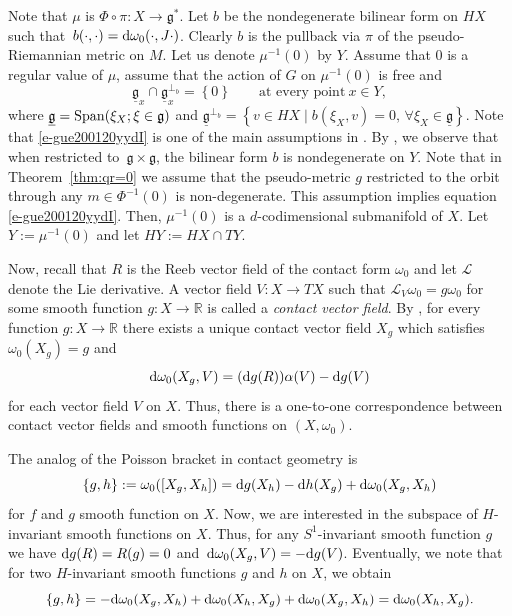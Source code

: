 \documentclass[pdftex]{sigma}
\numberwithin{equation}{section}
\newcommand{\set}[1]{\left\{#1\right\}}
\begin{document}
 	Note that $\mu$ is $\Phi\circ \pi \colon X \rightarrow \mathfrak{g}^*$. Let $b$ be the nondegenerate bilinear form on $HX$ such that~${
	 	b(\cdot , \cdot) = {\rm d}\omega_0(\cdot , J\cdot)}$.
	 Clearly $b$ is the pullback via $\pi$ of the pseudo-Riemannian metric on $M$. Let us denote $\mu^{-1}(0)$ by $Y$. Assume that $0$ is a regular value of $\mu$, assume that the action of $G$ on $\mu^{-1}(0)$ is free and
	 \begin{equation}\label{e-gue200120yydI}
	\underline{\mathfrak{g}}_x\cap \underline{\mathfrak{g}}^{\perp_b}_x=\set{0}\qquad \text{at every point} \ x\in Y,
	 \end{equation}
	 where $\underline{\mathfrak{g}}={\rm Span}(\xi_X; \xi\in\mathfrak{g})$
	 and
$\underline{\mathfrak{g}}^{\perp_b}=\set{v\in HX \mid b(\xi_X,v)=0,\,\forall \xi_X\in\underline{\mathfrak{g}}}$.
	 Note that \eqref{e-gue200120yydI} is one of the main assumptions in \cite{hsiaohuang}. By \cite[Section 2.5]{hsiaohuang}, we observe that when restricted to~${\mathfrak{g}\times \mathfrak{g}}$, the bilinear form $b$ is nondegenerate on $Y$. Note that in Theorem~\ref{thm:qr=0} we assume that the pseudo-metric $g$ restricted to the orbit through any $m\in \Phi^{-1}(0)$ is non-degenerate. This assumption implies equation \eqref{e-gue200120yydI}. Then, $\mu^{-1}(0)$ is a $d$-codimensional submanifold of $X$. Let $Y:=\mu^{-1}(0)$ and let $HY:=HX\cap TY$.
	
	
	 Now, recall that $R$ is the Reeb vector field of the contact form $\omega_0$ and let $\mathcal{L}$ denote the Lie derivative. A vector field $V \colon X \rightarrow TX$ such that $\mathcal{L}_V\omega_0=g \omega_0$ for some smooth function $g \colon X\rightarrow \mathbb{R}$ is called a \textit{contact vector field}. By \cite[Lemma 3.5.14]{mds}, for every function $g \colon X\rightarrow \mathbb{R}$ there exists a unique contact vector field $X_g$ which satisfies
	$\omega_0(X_g)=g $
	 and
	 \[ {\rm d}\omega_0(X_g, V)=({\rm d}g(R)) \alpha(V)-{\rm d}g(V)\]
	 for each vector field $V$ on $X$.
	 Thus, there is a one-to-one correspondence between contact vector fields and smooth functions on $(X, \omega_0)$.
	
	 The analog of the Poisson bracket in contact geometry is
	 \[\{g, h\}:=\omega_0([X_g, X_h])={\rm d}g(X_h)-{\rm d}h(X_g)+{\rm d}\omega_0(X_g, X_h) \]
	 for $f$ and $g$ smooth function on $X$. Now, we are interested in the subspace of $H$-invariant smooth functions on $X$. Thus, for any $S^1$-invariant smooth function $g$ we have ${\rm d}g(R)=R(g)=0$ and~${{\rm d}\omega_0(X_g, V)=-{\rm d}g(V)}$.
	 Eventually, we note that for two $H$-invariant smooth functions $g$ and $h$ on $X$, we obtain
	 \[\{g, h\}=-{\rm d}\omega_0(X_g, X_h)+{\rm d}\omega_0(X_h, X_g)+{\rm d}\omega_0(X_g, X_h)={\rm d}\omega_0(X_h, X_g) .\]
	
\end{document}
